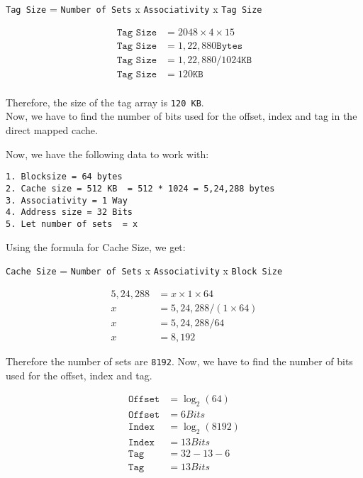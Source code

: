\documentclass[11pt]{article}
\begin{document}
\texttt{Tag Size} = \texttt{Number of Sets} x \texttt{Associativity} x \texttt{Tag Size}

\begin{equation}
\begin{split}
\texttt{Tag Size} &= 2048 \times 4 \times 15 \\
\texttt{Tag Size} &= 1,22,880  \texttt{Bytes} \\
\texttt{Tag Size} &= 1,22,880 / 1024 \texttt{KB} \\
\texttt{Tag Size} &= 120 \texttt{KB} \\
\end{split}
\end{equation}

Therefore, the size of the tag array is \texttt{120 KB}.
\\ Now, we have to find the number of bits used for the offset, index and tag in the direct mapped cache.

Now, we have the following data to work with:
\begin{verbatim}
1. Blocksize = 64 bytes
2. Cache size = 512 KB  = 512 * 1024 = 5,24,288 bytes
3. Associativity = 1 Way
4. Address size = 32 Bits
5. Let number of sets  = x
\end{verbatim}

Using the formula for Cache Size, we get:

\texttt{Cache Size} = \texttt{Number of Sets} x \texttt{Associativity} x \texttt{Block Size}

\begin{equation}
\begin{split}
5,24,288 &= x \times 1 \times 64 \\
x &= 5,24,288 / (1 \times 64) \\
x &= 5,24,288 /  64 \\
x &= 8,192
\end{split}
\end{equation}

Therefore the number of sets are \texttt{8192}.
Now, we have to find the number of bits used for the offset, index and tag.

\begin{equation}
\begin{split}
\texttt{Offset} &= \log_2(64) \\
\texttt{Offset} &= 6 Bits\\
\texttt{Index} &= \log_2(8192) \\
\texttt{Index} &= 13 Bits\\
\texttt{Tag} &= 32 - 13 - 6 \\
\texttt{Tag} &= 13 Bits
\end{split}
\end{equation}
    
\end{document}
